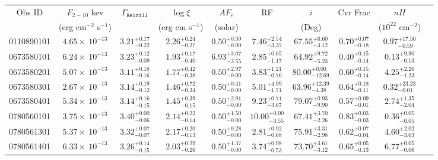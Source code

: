 \documentclass{article}
\begin{document}
\begin{landscape}
\begin{longtable}{cccccccccl}
\hline \multicolumn{1}{c}{Obs ID} & \multicolumn{1}{c}{$F_{2-10}$ kev} & \multicolumn{1}{c}{$\Gamma_\texttt{Relxill}$} & \multicolumn{1}{c}{$\log \xi$} & \multicolumn{1}{c}{$AF_e$} & \multicolumn{1}{c}{RF} & \multicolumn{1}{c}{$\textit{i}$} & \multicolumn{1}{c}{Cvr Frac} & \multicolumn{1}{c}{$nH$}\\  
\multicolumn{1}{c}{} & \multicolumn{1}{c}{(erg cm$^{-2}$ s$^{-1}$)} & \multicolumn{1}{c}{} & \multicolumn{1}{c}{(erg cm s$^{-1}$)} & \multicolumn{1}{c}{(solar)} & \multicolumn{1}{c}{} & \multicolumn{1}{c}{(Deg)} & \multicolumn{1}{c}{} & \multicolumn{1}{l}{($10^{22}$ cm$^{-2}$)}\\ \hline 
0110890101 & $4.65 \times~10^{-13}$ & $3.21^{+0.17}_{-0.22}$ & $2.26^{+0.24}_{-0.27}$ & $0.50^{+0.39}_{-0.00}$ & $7.46^{+2.54}_{-3.37}$ & $67.55^{+6.60}_{-3.12}$ &  $0.70^{+0.07}_{-0.18}$ &  $0.97^{+17.50}_{-0.59}$\\
0673580101 & $6.24 \times~10^{-13}$ & $3.23^{+0.12}_{-0.09}$ & $1.93^{+0.17}_{-0.40}$ & $6.93^{+3.07}_{-2.55}$ & $2.85^{+0.65}_{-1.17}$ & $64.92^{+9.72}_{-5.23}$ &  $0.40^{+0.15}_{-0.14}$ &  $0.13^{+9.90}_{-0.13}$\\
0673580201 & $5.07 \times~10^{-13}$ & $3.11^{+0.18}_{-0.16}$ & $1.77^{+0.42}_{-0.38}$ & $0.50^{+2.97}_{-0.00}$ & $3.83^{+1.21}_{-0.76}$ & $80.00^{+0.00}_{-12.69}$ &  $0.60^{+0.15}_{-0.14}$  &  $4.25^{+2.26}_{-1.23}$\\
0673580301 & $2.67 \times~10^{-13}$ & $3.14^{+0.19}_{-0.12}$ & $1.46^{+0.72}_{-0.34}$ & $0.50^{+0.41}_{-0.00}$ & $5.01^{+4.99}_{-1.71}$ & $63.96^{+12.39}_{-4.38}$ &  $0.64^{+0.18}_{-0.11}$  &  $0.32^{+23.23}_{-0.01}$ \\
0673580401 & $5.34 \times~10^{-13}$ & $3.14^{+0.16}_{-0.15}$ & $1.45^{+0.39}_{-0.15}$ & $0.50^{+2.91}_{-0.00}$ & $9.23^{+0.71}_{-3.67}$ & $79.07^{+0.93}_{-9.90}$ &  $0.57^{+0.09}_{-0.01}$ &  $2.74^{+1.35}_{-2.04}$ \\
0780560101 & $3.75 \times~10^{-13}$ & $3.40^{+0.00}_{-0.06}$ & $2.14^{+0.22}_{-0.14}$ & $0.50^{+1.50}_{-0.00}$ & $10.00^{+0.00}_{-3.55}$ & $67.41^{+3.70}_{-2.26}$ &  $0.83^{+0.03}_{-0.03}$ &  $0.36^{+0.05}_{-0.05}$  \\
0780561301 & $5.37 \times~10^{-13}$ & $3.32^{+0.07}_{-0.07}$ & $2.17^{+0.20}_{-0.13}$ & $0.50^{+0.28}_{-0.00}$ & $2.81^{+0.92}_{-0.68}$ & $75.91^{+3.31}_{-2.98}$ &  $0.62^{+0.07}_{-0.04}$ &  $4.60^{+2.02}_{-3.03}$  \\
0780561401 & $6.33 \times~10^{-13}$ & $3.26^{+0.14}_{-0.15}$ & $2.03^{+0.29}_{-0.26}$ & $0.50^{+1.37}_{-0.00}$ & $3.74^{+0.98}_{-0.53}$ & $73.70^{+3.61}_{-3.12}$ &  $0.65^{+0.05}_{-0.13}$ &  $6.77^{+0.05}_{-0.06}$  \\

\end{longtable}
\end{landscape}
\end{document}
